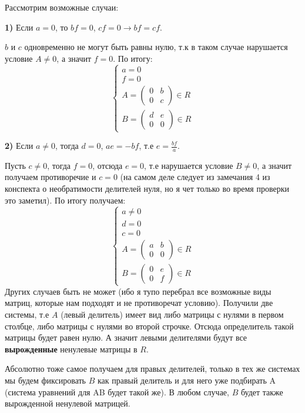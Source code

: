 \documentclass[a4paper,12pt]{article}
\begin{document}
\begin{itemize}
Рассмотрим возможные случаи:

\textbf{1)} Если $a = 0$, то $bf = 0$, $cf = 0 \rightarrow bf = cf$.

 $b$ и $c$ одновременно не могут быть равны нулю, т.к в таком случае нарушается условие $A \neq 0$, а значит $ f = 0 $. По итогу:
\[
\begin{cases}
a = 0 \\ 
f = 0 \\
A = \begin{pmatrix}
0 & b \\ 0 & c
\end{pmatrix} \in R\\
B = \begin{pmatrix}
d & e  \\ 0 & 0 
\end{pmatrix}  \in R 
\end{cases}
\]

\clearpage
\textbf{2) }Если $a \neq 0$, тогда $d = 0$, $ae = -bf$, т.е $e = \frac{bf}{a}$. 

Пусть $c \neq 0$, тогда $f = 0$, отсюда $e = 0$, т.е нарушается условие $B \neq 0$, а значит получаем противоречие и $c = 0$ (на самом деле следует из замечания 4 из конспекта о необратимости делителей нуля, но я чет только во время проверки это заметил). По итогу получаем:
\[
\begin{cases}
a \neq 0 \\
d = 0 \\
c = 0 \\ 
A = \begin{pmatrix}
a & b \\ 0 & 0
\end{pmatrix} \in R\\
B = \begin{pmatrix}
0 & e \\ 0 & f 
\end{pmatrix} \in R
\end{cases}
\]
Других случаев быть не может (ибо я тупо перебрал все возможные виды матриц, которые нам подходят и не противоречат условию). Получили две системы, т.е $A$ (левый делитель) имеет вид либо матрицы с нулями в первом столбце, либо матрицы с нулями во второй строчке. Отсюда определитель такой матрицы будет  равен нулю. А значит левыми делителями будут все \textbf{вырожденные} ненулевые матрицы в $R$. 

Абсолютно тоже самое получаем для правых делителей, только в тех же системах мы будем фиксировать $B$ как правый делитель и для него уже подбирать A (система уравнений для AB будет такой же). В любом случае, $B$ будет также вырожденной ненулевой матрицей.


\end{itemize}
\end{document}
